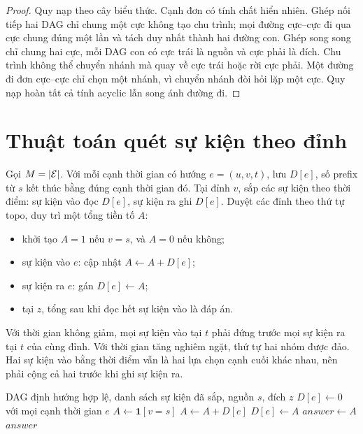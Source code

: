 \begin{proof}
Quy nạp theo cây biểu thức. Cạnh đơn có tính chất hiển nhiên. Ghép nối tiếp hai DAG chỉ chung một cực không tạo chu trình; mọi đường cực--cực đi qua cực chung đúng một lần và tách duy nhất thành hai đường con. Ghép song song chỉ chung hai cực, mỗi DAG con có cực trái là nguồn và cực phải là đích. Chu trình không thể chuyển nhánh mà quay về cực trái hoặc rời cực phải. Một đường đi đơn cực--cực chỉ chọn một nhánh, vì chuyển nhánh đòi hỏi lặp một cực. Quy nạp hoàn tất cả tính acyclic lẫn song ánh đường đi.
\end{proof}

\section{Thuật toán quét sự kiện theo đỉnh}

Gọi $M=|\mathcal{E}|$. Với mỗi cạnh thời gian có hướng $e=(u,v,t)$, lưu $D[e]$, số prefix từ $s$ kết thúc bằng đúng cạnh thời gian đó. Tại đỉnh $v$, sắp các sự kiện theo thời điểm: sự kiện vào đọc $D[e]$, sự kiện ra ghi $D[e]$. Duyệt các đỉnh theo thứ tự topo, duy trì một tổng tiền tố $A$:
\begin{itemize}
  \item khởi tạo $A=1$ nếu $v=s$, và $A=0$ nếu không;
  \item sự kiện vào $e$: cập nhật $A\gets A+D[e]$;
  \item sự kiện ra $e$: gán $D[e]\gets A$;
  \item tại $z$, tổng sau khi đọc hết sự kiện vào là đáp án.
\end{itemize}
Với thời gian không giảm, mọi sự kiện vào tại $t$ phải đứng trước mọi sự kiện ra tại $t$ của cùng đỉnh. Với thời gian tăng nghiêm ngặt, thứ tự hai nhóm được đảo. Hai sự kiện vào bằng thời điểm vẫn là hai lựa chọn cạnh cuối khác nhau, nên phải cộng cả hai trước khi ghi sự kiện ra.

\begin{algorithm}[htbp]
\caption{Đếm sự kiện thời gian trên DAG}
\label{alg:dag-events}
\begin{algorithmic}[1]
\Require DAG định hướng hợp lệ, danh sách sự kiện đã sắp, nguồn $s$, đích $z$
\State $D[e]\gets0$ với mọi cạnh thời gian $e$
  \State $A\gets\mathbf{1}[v=s]$
      \State $A\gets A+D[e]$
    \Else
      \State $D[e]\gets A$
    \EndIf
  \EndFor
   \State $\mathit{answer}\gets A$ \EndIf
\EndFor
\State \Return $\mathit{answer}$
\end{algorithmic}
\end{algorithm}

